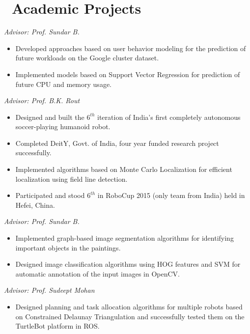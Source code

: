 \documentclass{resume}
\begin{document}
\section{\faCodeFork\ Academic Projects}
\textit{Advisor: Prof. Sundar B.} \hfill
\begin{itemize}
  \item Developed approaches based on user behavior modeling for the prediction of future workloads on the Google cluster dataset.
  \item Implemented models based on Support Vector Regression for prediction of future CPU and memory usage.
\end{itemize}

\textit{Advisor: Prof. B.K. Rout} \hfill
\begin{itemize}
	\item Designed and built the $6^{th}$ iteration of India's first completely autonomous soccer-playing humanoid robot.
	\item Completed DeitY, Govt. of India, four year funded research project successfully.
	\item Implemented algorithms based on Monte Carlo Localization for efficient localization using field line detection.
	\item Participated and stood $6^{th}$ in RoboCup 2015 (only team from India) held in Hefei, China.
\end{itemize}

\textit{Advisor: Prof. Sundar B.} \hfill
\begin{itemize}
	\item Implemented graph-based image segmentation algorithms for identifying important objects in the paintings.
	\item Designed image classification algorithms using HOG features and SVM for automatic annotation of the input images in OpenCV.
\end{itemize}

\textit{Advisor: Prof. Sudeept Mohan} \hfill
\begin{itemize}
	\item Designed planning and task allocation algorithms for multiple robots based on Constrained Delaunay Triangulation and successfully tested them on the TurtleBot platform in ROS.
\end{itemize}
\end{document}
